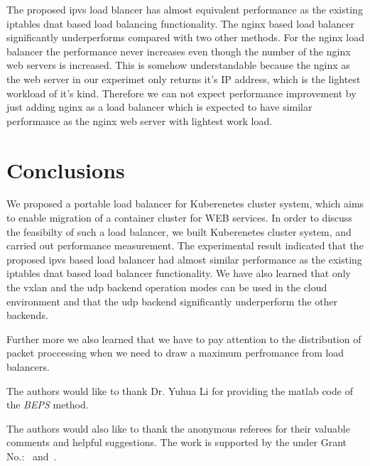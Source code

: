 The proposed ipvs load blancer has almost equivalent performance as the existing iptables 
dnat based load balancing functionality. 
The nginx based load balancer significantly underperforms compared with two other methods.
For the nginx load balancer the performance never increases even though the number of the 
nginx web servers is increased.
This is somehow understandable because the nginx as the web server in our experimet only 
returns it's IP address, which is the lightest workload of it's kind.
Therefore we can not expect performance improvement by just adding nginx as a load balancer 
which is expected to have similar performance as the nginx web server with lightest work load.  

\section{Conclusions}\label{Conclusions}

We proposed a portable load balancer for Kuberenetes cluster system, 
which aims to enable migration of a container cluster for WEB services.
In order to discuss the feasibilty of such a load balancer, we built 
Kuberenetes cluster system, and carried out performance measurement.
The experimental result indicated that the proposed ipvs based load balancer
had almost similar performance as the existing iptables dnat based load balancer functionality.
We have also learned that only the vxlan and the udp backend operation modes can be used 
in the cloud environment and that the udp backend significantly underperform the other backends.

Further more we also learned that we have to pay attention to the distribution of packet proccessing
when we need to draw a maximum perfromance from load balancers.




\begin{acks}
  The authors would like to thank Dr. Yuhua Li for providing the
  matlab code of  the \textit{BEPS} method. 

  The authors would also like to thank the anonymous referees for
  their valuable comments and helpful suggestions. The work is
  supported by the  under Grant
  No.:~
  and~.

\end{acks}
